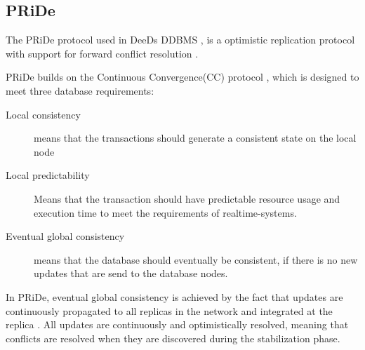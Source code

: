 
\subsection{PRiDe}
\label{sub:pride}

The PRiDe protocol used in DeeDs DDBMS \cite[]{deeds}, is a optimistic replication protocol with support for forward conflict resolution \cite[]{Syber2007}. 

PRiDe builds on the Continuous Convergence(CC) protocol \cite[]{consistency2005}, which is designed to meet three database requirements: 
\begin{description}
	\item[Local consistency] means that the transactions should generate a consistent state on the local node
	\item[Local predictability] Means that the transaction should have predictable resource usage and execution time to meet the requirements of realtime-systems.  
	\item[Eventual global consistency] means that the database should eventually be consistent, if there is no new updates that are send to the database nodes.  
\end{description}    

In PRiDe, eventual global consistency is achieved by the fact that  updates are continuously propagated to all replicas in the network and integrated at the replica . All updates are continuously and optimistically resolved, meaning that conflicts are resolved when they are discovered during the stabilization phase. 
